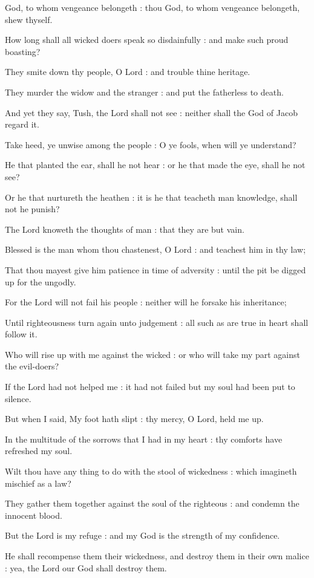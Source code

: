 
 God, to whom vengeance belongeth : thou God, to whom vengeance belongeth, shew thyself.\par
{}
How long shall all wicked doers speak so disdainfully : and make such proud boasting?\par
{}They smite down thy people, O Lord : and trouble thine heritage.\par
{}They murder the widow and the stranger : and put the fatherless to death.\par
{}And yet they say, Tush, the Lord shall not see : neither shall the God of Jacob regard it.\par
{}Take heed, ye unwise among the people : O ye fools, when will ye understand?\par
{}He that planted the ear, shall he not hear : or he that made the eye, shall he not see?\par
{}Or he that nurtureth the heathen : it is he that teacheth man knowledge, shall not he punish?\par
{}The Lord knoweth the thoughts of man : that they are but vain.\par
{}Blessed is the man whom thou chastenest, O Lord : and teachest him in thy law;\par
{}That thou mayest give him patience in time of adversity : until the pit be digged up for the ungodly.\par
{}For the Lord will not fail his people : neither will he forsake his inheritance;\par
{}Until righteousness turn again unto judgement : all such as are true in heart shall follow it.\par
{}Who will rise up with me against the wicked : or who will take my part against the evil-doers?\par
{}If the Lord had not helped me : it had not failed but my soul had been put to silence.\par
{}But when I said, My foot hath slipt : thy mercy, O Lord, held me up.\par
{}In the multitude of the sorrows that I had in my heart : thy comforts have refreshed my soul.\par
{}Wilt thou have any thing to do with the stool of wickedness : which imagineth mischief as a law?\par
{}They gather them together against the soul of the righteous : and condemn the innocent blood.\par
{}But the Lord is my refuge : and my God is the strength of my confidence.\par
{}He shall recompense them their wickedness, and destroy them in their own malice : yea, the Lord our God shall destroy them.\par

